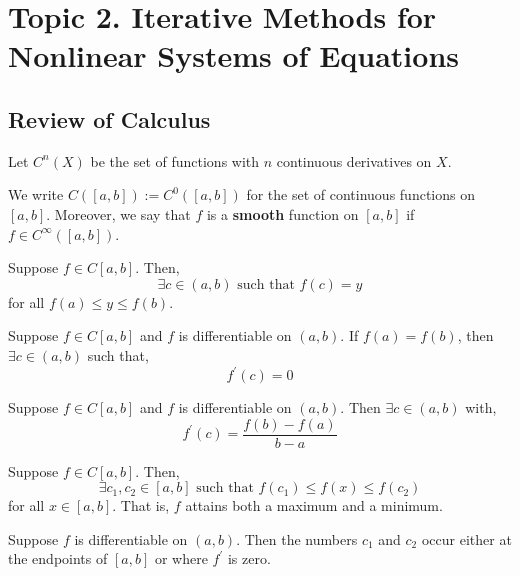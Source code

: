 \section{Topic 2. Iterative Methods for Nonlinear Systems of Equations}
\subsection{Review of Calculus}
Let $C^n(X)$ be the set of functions with $n$ continuous derivatives on $X$.

\begin{marginfigure}
We write $C([a,b]) := C^{0}([a, b])$ for the set of continuous functions on $[a, b]$. Moreover, we say that $f$ is a \textbf{smooth} function on $[a, b]$ if $f \in C^{\infty}([a,b])$.
\end{marginfigure}

\begin{thm}
   Suppose $f \in C[a, b]$. Then,
   \[\exists c \in (a, b) \text{ such that } f(c) = y\]
   for all $f(a) \leq y \leq f(b)$.
\end{thm}

\begin{thm}
    Suppose $f \in C[a, b]$ and $f$ is differentiable on $(a, b)$. If $f(a)=f(b)$, then $\exists c \in (a, b)$ such that,
    \[f^{\prime}(c)=0\]
\end{thm}

\begin{thm}
    Suppose $f \in C[a, b]$ and $f$ is differentiable on $(a, b)$. Then $\exists c \in (a, b)$ with,
    \[f^{\prime}(c)=\frac{f(b)-f(a)}{b-a}\]
\end{thm}

\begin{thm}
    Suppose $f \in C[a, b]$. Then,
    \[\exists  c_1, c_2 \in [a, b] \text{ such that } f\left(c_1\right) \leq f(x) \leq f\left(c_2\right)\]
    for all $x \in[a, b]$. That is, $f$ attains both a maximum and a minimum.
\end{thm}

\begin{cor}
    Suppose $f$ is differentiable on $(a, b)$. Then the numbers $c_1$ and $c_2$ occur either at the endpoints of $[a, b]$ or where $f^{\prime}$ is zero.
\end{cor}

